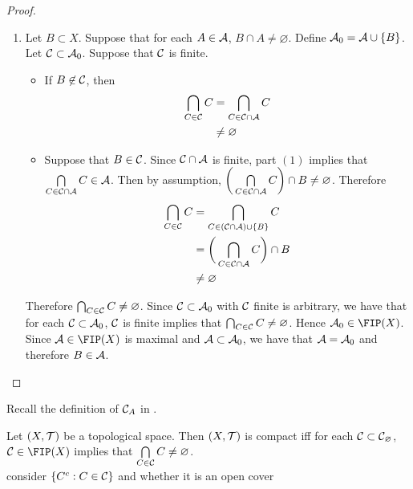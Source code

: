 \documentclass{book}
\begin{document}
\begin{proof}
\begin{enumerate}
			\item Let $B \subset X$. Suppose that for each $A \in \mathcal{A}$, $B \cap A \neq \varnothing$. Define $\mathcal{A}_0 = \mathcal{A} \cup \{B\}$. Let $\mathcal{C} \subset \mathcal{A}_0$. Suppose that $\mathcal{C}$ is finite. 
			\begin{itemize}
				\item If $B \not \in \mathcal{C}$, then 
				\begin{align*}
					\bigcap_{C \in \mathcal{C}} C
					& = \bigcap_{C \in \mathcal{C} \cap \mathcal{A}} C \\
					& \neq \varnothing
				\end{align*} 
				\item Suppose that $B \in \mathcal{C}$. Since $\mathcal{C} \cap \mathcal{A}$ is finite, part $(1)$ implies that $\bigcap\limits_{C \in \mathcal{C} \cap \mathcal{A}} C \in \mathcal{A}$. Then by assumption, $\bigg( \bigcap\limits_{C \in \mathcal{C} \cap \mathcal{A}} C \bigg) \cap B \neq \varnothing$.  Therefore 
				\begin{align*}
					\bigcap_{C \in \mathcal{C}} C
					& = \bigcap_{C \in (\mathcal{C} \cap \mathcal{A}) \cup \{B\}} C \\
					& = \bigg( \bigcap_{C \in \mathcal{C} \cap \mathcal{A}} C \bigg) \cap B \\
					& \neq \varnothing
				\end{align*}  
			\end{itemize}
			Therefore $\bigcap_{C \in \mathcal{C}} C \neq \varnothing$. Since $\mathcal{C} \subset \mathcal{A}_0$ with $\mathcal{C}$ finite is arbitrary, we have that for each $\mathcal{C} \subset \mathcal{A}_0$, $\mathcal{C}$ is finite implies that $\bigcap_{C \in \mathcal{C}} C \neq \varnothing$. Hence $\MA_0 \in \FIP(X)$. Since $\MA \in \FIP(X)$ is maximal and $\mathcal{A} \subset \mathcal{A}_0$, we have that $\mathcal{A} = \mathcal{A}_0$ and therefore $B \in \mathcal{A}$. 
		\end{enumerate}
	\end{proof}
	
	\begin{note}
		Recall the definition of $\mathcal{C}_A$ in .
	\end{note}
	
	\begin{ex}
		Let $(X, \mathcal{T})$ be a topological space. Then $(X, \mathcal{T})$ is compact iff for each $\mathcal{C} \subset \mathcal{C}_\varnothing$, $\MC \in \FIP(X)$ implies that $\bigcap\limits_{C \in \mathcal{C}} C \neq \varnothing$. \\
		 consider $\{C^c: C \in \mathcal{C}\}$ and whether it is an open cover
	\end{ex}
\end{document}
